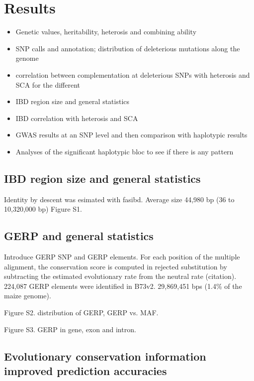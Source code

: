 \documentclass[10pt]{article}
\begin{document}
\section*{Results}

\begin{itemize}
  \item Genetic values, heritability, heterosis and combining ability 
  \item SNP calls and annotation; distribution of deleterious mutations along the genome 
  \item correlation between complementation at deleterious SNPs with heterosis and SCA for the different 
  \item IBD region size and general statistics 
  \item IBD correlation with heterosis and SCA
  \item GWAS results at an SNP level and then comparison with haplotypic results 
  \item Analyses of the significant haplotypic bloc to see if there is any pattern
\end{itemize}

\subsection*{IBD region size and general statistics}

Identity by descent was esimated with fasibd.
Average size 44,980 bp (36 to 10,320,000 bp)
Figure S1.



\subsection*{GERP and general statistics}

Introduce GERP SNP and GERP elements. For each position of the multiple alignment, the conservation score is computed in rejected substitution by subtracting the estimated evolutionary rate from the neutral rate (citation).
224,087 GERP elements were identified in B73v2. 
29,869,451 bps (1.4\% of the maize genome).


Figure S2. distribution of GERP, GERP vs. MAF.



Figure S3. GERP in gene, exon and intron.


\subsection*{Evolutionary conservation information improved prediction accuracies}
\end{document}
